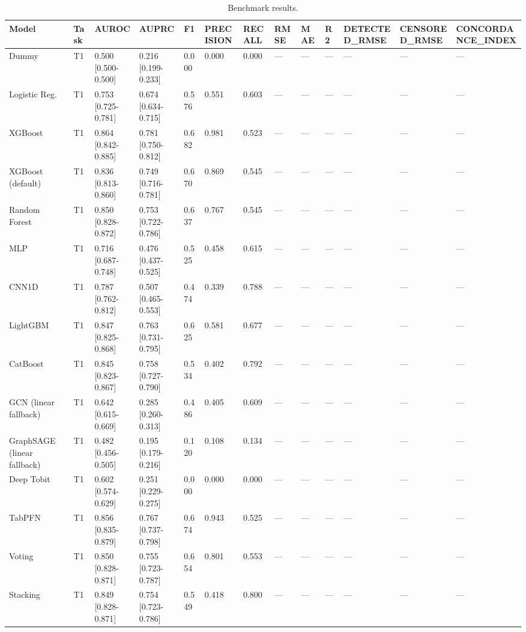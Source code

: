 \begin{table}
\caption{Benchmark results.}
\label{tab:results}
\begin{tabular}{lllllllllllll}
\toprule
Model & Task & AUROC & AUPRC & F1 & PRECISION & RECALL & RMSE & MAE & R2 & DETECTED_RMSE & CENSORED_RMSE & CONCORDANCE_INDEX \\
\midrule
Dummy & T1 & 0.500 [0.500-0.500] & 0.216 [0.199-0.233] & 0.000 & 0.000 & 0.000 & — & — & — & — & — & — \\
Logistic Reg. & T1 & 0.753 [0.725-0.781] & 0.674 [0.634-0.715] & 0.576 & 0.551 & 0.603 & — & — & — & — & — & — \\
XGBoost & T1 & 0.864 [0.842-0.885] & 0.781 [0.750-0.812] & 0.682 & 0.981 & 0.523 & — & — & — & — & — & — \\
XGBoost (default) & T1 & 0.836 [0.813-0.860] & 0.749 [0.716-0.781] & 0.670 & 0.869 & 0.545 & — & — & — & — & — & — \\
Random Forest & T1 & 0.850 [0.828-0.872] & 0.753 [0.722-0.786] & 0.637 & 0.767 & 0.545 & — & — & — & — & — & — \\
MLP & T1 & 0.716 [0.687-0.748] & 0.476 [0.437-0.525] & 0.525 & 0.458 & 0.615 & — & — & — & — & — & — \\
CNN1D & T1 & 0.787 [0.762-0.812] & 0.507 [0.465-0.553] & 0.474 & 0.339 & 0.788 & — & — & — & — & — & — \\
LightGBM & T1 & 0.847 [0.825-0.868] & 0.763 [0.731-0.795] & 0.625 & 0.581 & 0.677 & — & — & — & — & — & — \\
CatBoost & T1 & 0.845 [0.823-0.867] & 0.758 [0.727-0.790] & 0.534 & 0.402 & 0.792 & — & — & — & — & — & — \\
GCN (linear fallback) & T1 & 0.642 [0.615-0.669] & 0.285 [0.260-0.313] & 0.486 & 0.405 & 0.609 & — & — & — & — & — & — \\
GraphSAGE (linear fallback) & T1 & 0.482 [0.456-0.505] & 0.195 [0.179-0.216] & 0.120 & 0.108 & 0.134 & — & — & — & — & — & — \\
Deep Tobit & T1 & 0.602 [0.574-0.629] & 0.251 [0.229-0.275] & 0.000 & 0.000 & 0.000 & — & — & — & — & — & — \\
TabPFN & T1 & 0.856 [0.835-0.879] & 0.767 [0.737-0.798] & 0.674 & 0.943 & 0.525 & — & — & — & — & — & — \\
Voting & T1 & 0.850 [0.828-0.871] & 0.755 [0.723-0.787] & 0.654 & 0.801 & 0.553 & — & — & — & — & — & — \\
Stacking & T1 & 0.849 [0.828-0.871] & 0.754 [0.723-0.786] & 0.549 & 0.418 & 0.800 & — & — & — & — & — & — \\

\end{tabular}
\end{table}
